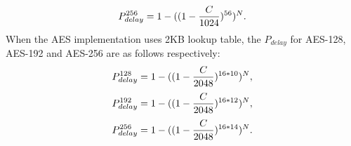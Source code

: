 \begin{equation}
    \scriptsize
    P_{delay}^{256} = 1- ((1-\frac{C}{1024})^{56})^{N}.
\end{equation}
When the AES implementation uses 2KB lookup table, the $P_{delay}$ for AES-128, AES-192 and AES-256 are as follows respectively:
\begin{equation}
    \scriptsize
    P_{delay}^{128} = 1- ((1-\frac{C}{2048})^{16*10})^{N},
\end{equation}
\begin{equation}
    \scriptsize
    P_{delay}^{192} = 1- ((1-\frac{C}{2048})^{16*12})^{N},
\end{equation}
\begin{equation}
    \scriptsize
    P_{delay}^{256} = 1- ((1-\frac{C}{2048})^{16*14})^{N}.
\end{equation} 
